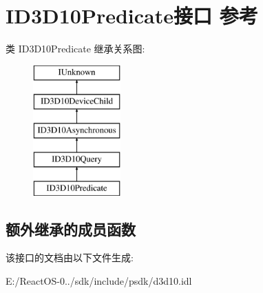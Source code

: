 \hypertarget{interface_i_d3_d10_predicate}{}\section{I\+D3\+D10\+Predicate接口 参考}
\label{interface_i_d3_d10_predicate}
类 I\+D3\+D10\+Predicate 继承关系图\+:\begin{figure}[H]
\begin{center}
\leavevmode
\includegraphics[height=5.000000cm]{interface_i_d3_d10_predicate}
\end{center}
\end{figure}
\subsection*{额外继承的成员函数}


该接口的文档由以下文件生成\+:\begin{DoxyCompactItemize}
\item 
E\+:/\+React\+O\+S-\/0../sdk/include/psdk/d3d10.\+idl\end{DoxyCompactItemize}
